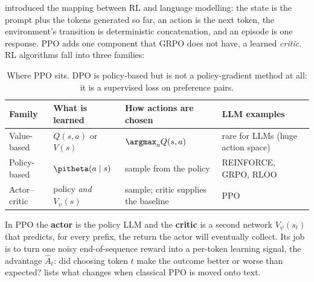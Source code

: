  introduced the mapping between RL and language modelling: the state is the prompt
plus the tokens generated so far, an action is the next token, the environment's transition is
deterministic concatenation, and an episode is one response. PPO adds one component that GRPO
does not have, a learned \emph{critic}. RL algorithms fall into three families:

\begin{table}[h]
\centering\small
\begin{tabularx}{\linewidth}{@{}lXXl@{}}
\toprule
\textbf{Family} & \textbf{What is learned} & \textbf{How actions are chosen} & \textbf{LLM examples}\\
\midrule
Value-based & $Q(s,a)$ or $V(s)$ & $\argmax_a Q(s,a)$ & rare for LLMs (huge action space)\\
Policy-based & $\pitheta(a\mid s)$ & sample from the policy & REINFORCE, GRPO, RLOO\\
Actor--critic & policy \emph{and} $V_\psi(s)$ & sample; critic supplies the baseline & PPO\\
\bottomrule
\end{tabularx}
\caption{Where PPO sits. DPO is policy-based but is not a policy-gradient method at all: it is a
supervised loss on preference pairs.}
\label{tab:rlhf:families}
\end{table}

In PPO the \textbf{actor} is the policy LLM and the \textbf{critic} is a second network
$V_\psi(s_t)$ that predicts, for every prefix, the return the actor will eventually collect.
Its job is to turn one noisy end-of-sequence reward into a per-token learning signal, the
advantage $\hat A_t$: did choosing token $t$ make the outcome better or worse than expected?
 lists what changes when classical PPO is moved onto text.

